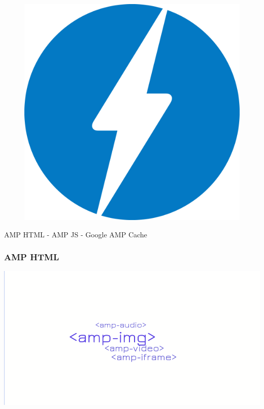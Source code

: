\documentclass[graphic, aspectratio=169]{beamer}
\begin{document}

\begin{frame}
    \begin{figure}[h!]
    \centering
    \includegraphics[scale=0.1]{images/logo-AMP.png}
    \label{fig:AMP logo}
    \end{figure}
    \begin{center}
    AMP HTML   -   AMP JS  -  Google AMP Cache
    \end{center}
\end{frame}

\begin{frame}
    
\frametitle{AMP HTML}

\end{frame}

{\includegraphics[width=\paperwidth,height=\paperheight]{images/replaced_tags.png}}
\begin{frame}
\end{frame}
\end{document}
